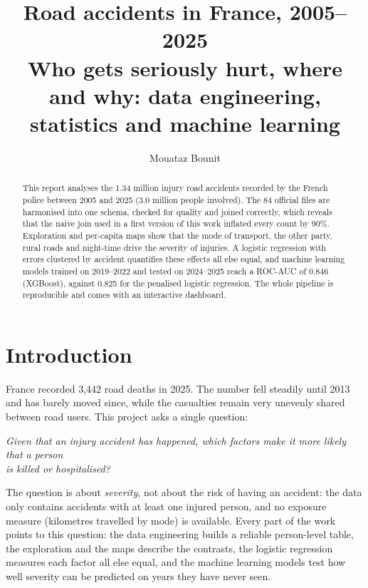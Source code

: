 \documentclass[11pt,a4paper]{article}
\title{\textbf{Road accidents in France, 2005--2025}\\[0.3em]
\large Who gets seriously hurt, where and why: data engineering, statistics and machine learning}
\author{Mouataz Bounit}
\date{}
\begin{document}
\maketitle
\vspace{-2.5em}

\begin{abstract}
\noindent
This report analyses the 1.34 million injury road accidents recorded by the French police between 2005
and 2025 (3.0 million people involved). The 84 official files are harmonised into one schema, checked for
quality and joined correctly, which reveals that the naive join used in a first version of this work
inflated every count by 90\%. Exploration and per-capita maps show that the mode of transport, the
other party, rural roads and night-time drive the severity of injuries. A logistic regression with
errors clustered by accident quantifies these effects all else equal, and machine learning models trained
on 2019--2022 and tested on 2024--2025 reach a ROC-AUC of 0.846 (XGBoost), against 0.825 for the
penalised logistic regression. The whole pipeline is reproducible and comes with an interactive dashboard.
\end{abstract}

\section{Introduction}

France recorded 3,442 road deaths in 2025. The number fell steadily until 2013 and has barely moved
since, while the casualties remain very unevenly shared between road users. This project asks a single
question:

\begin{center}
\emph{Given that an injury accident has happened, which factors make it more likely that a person\\ is
killed or hospitalised?}
\end{center}

The question is about \emph{severity}, not about the risk of having an accident: the data only contains
accidents with at least one injured person, and no exposure measure (kilometres travelled by mode) is
available. Every part of the work points to this question: the data engineering builds a reliable
person-level table, the exploration and the maps describe the contrasts, the logistic regression
measures each factor all else equal, and the machine learning models test how well severity can be
predicted on years they have never seen.
\end{document}
